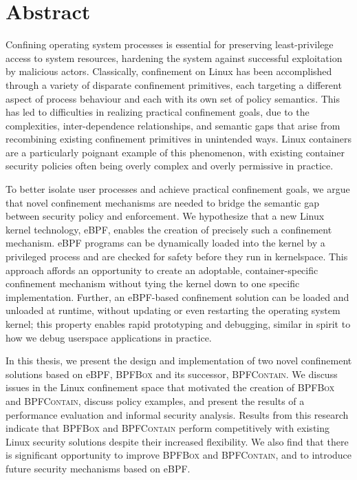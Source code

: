 \documentclass[
  fontsize=12pt,
  titlepage=firstiscover,
  paper=letter,
  oneside,
  cleardoublepage=plain,
  parskip=half-,
  DIV=10,
  parindent,
  appendixprefix,
  chapterprefix,
  listof=totoc,
]{scrbook}
\newcommand{\bpfbox}{\textsc{BPFBox}}
\newcommand{\bpfcontain}{\textsc{BPFContain}}
\begin{document}
\chapter*{Abstract}%
%
\begingroup
\small
Confining operating system processes is essential for preserving least-privilege access to
system resources, hardening the system against successful exploitation by malicious
actors. Classically, confinement on Linux has been accomplished through a variety of
disparate confinement primitives, each targeting a different aspect of process behaviour
and each with its own set of policy semantics. This has led to difficulties in realizing
practical confinement goals, due to the complexities, inter-dependence relationships, and
semantic gaps that arise from recombining existing confinement primitives in unintended
ways. Linux containers are a particularly poignant example of this phenomenon, with
existing container security policies often being overly complex and overly permissive in
practice.

To better isolate user processes and achieve practical confinement goals, we argue that
novel confinement mechanisms are needed to bridge the semantic gap between security policy
and enforcement. We hypothesize that a new Linux kernel technology, eBPF, enables the
creation of precisely such a confinement mechanism. eBPF programs can be dynamically
loaded into the kernel by a privileged process and are checked for safety before they run
in kernelspace.  This approach affords an opportunity to create an adoptable,
container-specific confinement mechanism without tying the kernel down to one specific
implementation.  Further, an eBPF-based confinement solution can be loaded and unloaded at
runtime, without updating or even restarting the operating system kernel; this property
enables rapid prototyping and debugging, similar in spirit to how we debug userspace
applications in practice.

In this thesis, we present the design and implementation of two novel confinement
solutions based on eBPF, \bpfbox{} and its successor, \bpfcontain{}. We discuss issues in
the Linux confinement space that motivated the creation of \bpfbox{} and \bpfcontain{},
discuss policy examples, and present the results of a performance evaluation and informal
security analysis. Results from this research indicate that \bpfbox{} and \bpfcontain{}
perform competitively with existing Linux security solutions despite their increased
flexibility.  We also find that there is significant opportunity to improve \bpfbox{} and
\bpfcontain{}, and to introduce future security mechanisms based on eBPF\@.
\end{document}
